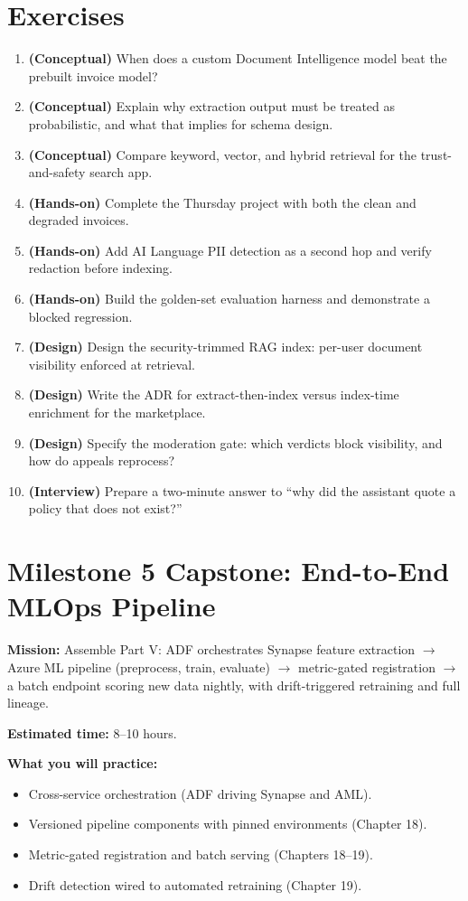 \section{Exercises}
\begin{enumerate}
    \item \textbf{(Conceptual)} When does a custom Document Intelligence model beat the prebuilt invoice model?
    \item \textbf{(Conceptual)} Explain why extraction output must be treated as probabilistic, and what that implies for schema design.
    \item \textbf{(Conceptual)} Compare keyword, vector, and hybrid retrieval for the trust-and-safety search app.
    \item \textbf{(Hands-on)} Complete the Thursday project with both the clean and degraded invoices.
    \item \textbf{(Hands-on)} Add AI Language PII detection as a second hop and verify redaction before indexing.
    \item \textbf{(Hands-on)} Build the golden-set evaluation harness and demonstrate a blocked regression.
    \item \textbf{(Design)} Design the security-trimmed RAG index: per-user document visibility enforced at retrieval.
    \item \textbf{(Design)} Write the ADR for extract-then-index versus index-time enrichment for the marketplace.
    \item \textbf{(Design)} Specify the moderation gate: which verdicts block visibility, and how do appeals reprocess?
    \item \textbf{(Interview)} Prepare a two-minute answer to ``why did the assistant quote a policy that does not exist?''
\end{enumerate}

\section{Milestone 5 Capstone: End-to-End MLOps Pipeline}\label{sec:ch20-capstone}

\begin{capstonebox}
\textbf{Mission:} Assemble Part V: ADF orchestrates Synapse feature extraction $\rightarrow$ Azure ML pipeline (preprocess, train, evaluate) $\rightarrow$ metric-gated registration $\rightarrow$ a batch endpoint scoring new data nightly, with drift-triggered retraining and full lineage.

\textbf{Estimated time:} 8--10 hours.

\textbf{What you will practice:}
\begin{itemize}
    \item Cross-service orchestration (ADF driving Synapse and AML).
    \item Versioned pipeline components with pinned environments (Chapter 18).
    \item Metric-gated registration and batch serving (Chapters 18--19).
    \item Drift detection wired to automated retraining (Chapter 19).
\end{itemize}
\end{capstonebox}

